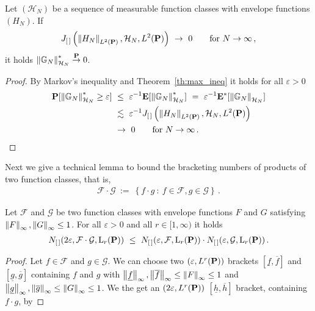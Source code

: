 \begin{lemma}
  \label{markov_max_lemma}
  Let $(\mathcal{H}_N)$ be a sequence of measurable function classes with envelope functions $(H_N)$.
  If
  \begin{gather*}
    J_{[\, ]}
    \left( 
    \norm{H_N}_{ L^2(\P)}
    ,
    \mathcal{H}_N
    ,
     L^2(\P)
    \right)
    \ 
    \to
    \ 
    0
    \qquad
    \text{for}
    \ 
    N
    \to
    \infty
    \,,
  \end{gather*}
  it holds 
  $
  \norm{\G_N}^*_{\mathcal{H}_N}\overset{\P}{\to}0
  $.
\end{lemma}
\begin{proof}
  By Markov's inequality and Theorem~\ref{th:max_ineq} it holds for all $\varepsilon>0$
  \begin{align*}
    \P
    [
  \norm{\G_N}^*_{\mathcal{H}_N}
  \ge
  \varepsilon
    ]
    &
    \ 
    \le
    \ 
    \varepsilon^{-1}
    \E
    [
  \norm{\G_N}^*_{\mathcal{H}_N}
    ]
    \ 
    =
    \ 
    \varepsilon^{-1}
    \E^*
    [
  \norm{\G_N}_{\mathcal{H}_N}
    ]
    \\
    &
    \ 
    \lesssim
    \ 
    \varepsilon^{-1}
    J_{[\, ]}
    \left( 
    \norm{H_N}_{ L^2(\P)}
    ,
    \mathcal{H}_N
    ,
     L^2(\P)
    \right)
    \\
    &
    \ 
    \to
    \ 
    0
    \qquad
    \text{for}
    \ 
    N\to\infty
    \,.
  \end{align*}
\end{proof}
Next we give a technical lemma to 
bound the bracketing numbers of products of two function classes, that is,
\begin{gather*}
  \mathcal{F}\cdot \mathcal{G}
  \ 
  :=
  \ 
  \left\{ 
    f\cdot g
    \ 
    \colon
  \ 
    f\in\mathcal{F},
    g\in\mathcal{G}
  \right\}\,.
\end{gather*}
\begin{lemma}
  \label{lem_prod_br}
  Let
  $\mathcal{F}$ and $\mathcal{G}$ be two function classes 
  with envelope functions $F$ and $G$ satisfying
  $\norm{F}_\infty,\norm{G}_\infty\le 1$.
  For all $\varepsilon>0$ and all $r\in [1,\infty)$ it holds
  \begin{gather*}
    N_{[\,]}(2\varepsilon,\mathcal{F}\cdot\mathcal{G},\mathrm{L}_r(\P))
    \
    \le
    \ 
    N_{[\,]}(\varepsilon,\mathcal{F},\mathrm{L}_r(\P))
    \cdot
    N_{[\,]}(\varepsilon,\mathcal{G},\mathrm{L}_r(\P))
    \,.
  \end{gather*}
\end{lemma}
\begin{proof}
  Let $f\in\mathcal{F}$ and $g\in\mathcal{G}$.
  We can choose two 
  $(\varepsilon,L^r(\P))$
  brackets
  $[\underline{f},\overline{f}]$
  and
  $[\underline{g},\overline{g}]$
  containing $f$ and $g$ with 
  $\norm{\underline{f}}_\infty,\norm{\overline{f}}_\infty\le\norm{F}_\infty\le 1$
  and
  $\norm{\underline{g}}_\infty,\norm{\overline{g}}_\infty\le\norm{G}_\infty\le 1$.
  We the get an 
  $(2\varepsilon,L^r(\P))$
  $[\underline{h},\overline{h}]$
  bracket, containing $f\cdot g$, by
\end{proof}
